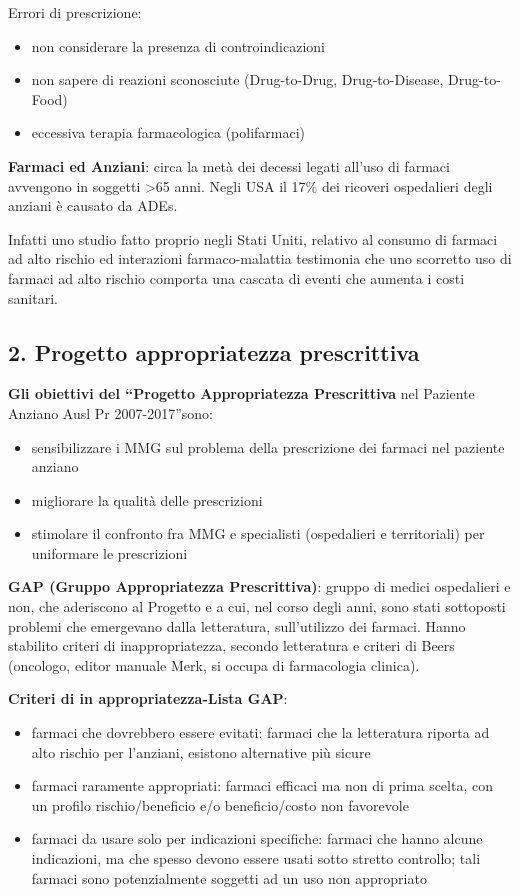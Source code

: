   Errori di prescrizione:
  
\begin{itemize}
\item non considerare la presenza di controindicazioni
\item non sapere di reazioni sconosciute (Drug-to-Drug, Drug-to-Disease,
  Drug-to-Food)
\item eccessiva terapia farmacologica (polifarmaci)
\end{itemize}

  \textbf{Farmaci ed Anziani}: circa la metà dei decessi legati all'uso
  di farmaci avvengono in soggetti \textgreater{}65 anni. Negli USA il
  17\% dei ricoveri ospedalieri degli anziani è causato da ADEs.

  Infatti uno studio fatto proprio negli Stati Uniti, relativo al
  consumo di farmaci ad alto rischio ed interazioni farmaco-malattia
  testimonia che uno scorretto uso di farmaci ad alto rischio comporta
  una cascata di eventi che aumenta i costi sanitari.

  \subsection{2. Progetto appropriatezza prescrittiva}
  
  \textbf{Gli obiettivi del ``Progetto Appropriatezza Prescrittiva} nel
  Paziente Anziano Ausl Pr 2007-2017''sono:

\begin{itemize}
\item
  sensibilizzare i MMG sul problema della prescrizione dei farmaci nel
  paziente anziano
\item
  migliorare la qualità delle prescrizioni
\item
  stimolare il confronto fra MMG e specialisti (ospedalieri e
  territoriali) per uniformare le prescrizioni
\end{itemize}

  \textbf{GAP (Gruppo Appropriatezza Prescrittiva)}: gruppo di medici
  ospedalieri e non, che aderiscono al Progetto e a cui, nel corso degli
  anni, sono stati sottoposti problemi che emergevano dalla letteratura,
  sull'utilizzo dei farmaci. Hanno stabilito criteri di
  inappropriatezza, secondo letteratura e criteri di Beers (oncologo,
  editor manuale Merk, si occupa di farmacologia clinica).

  \textbf{Criteri di in appropriatezza-Lista GAP}:

\begin{itemize}
\item
  farmaci che dovrebbero essere evitati: farmaci che la letteratura
  riporta ad alto rischio per l'anziani, esistono alternative più sicure
\item
  farmaci raramente appropriati: farmaci efficaci ma non di prima
  scelta, con un profilo rischio/beneficio e/o beneficio/costo non
  favorevole
\item
  farmaci da usare solo per indicazioni specifiche: farmaci che hanno
  alcune indicazioni, ma che spesso devono essere usati sotto stretto
  controllo; tali farmaci sono potenzialmente soggetti ad un uso non
  appropriato
\end{itemize}

